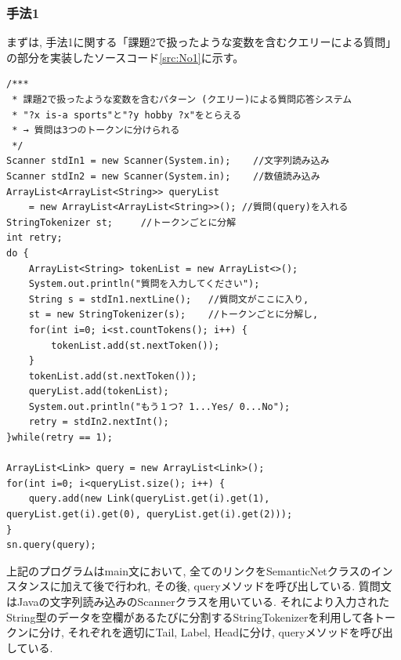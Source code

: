 \documentclass[uplatex,12pt]{jsarticle}
\begin{document}
\subsubsection{手法1}
まずは, 手法1に関する「課題2で扱ったような変数を含むクエリーによる質問」の部分を実装したソースコード\ref{src:No1}に示す。
\begin{lstlisting}[caption=クエリーの形に添った質問応答, label=src:No1]
/***
 * 課題2で扱ったような変数を含むパターン (クエリー)による質問応答システム
 * "?x is-a sports"と"?y hobby ?x"をとらえる
 * → 質問は3つのトークンに分けられる
 */
Scanner stdIn1 = new Scanner(System.in);	//文字列読み込み
Scanner stdIn2 = new Scanner(System.in);	//数値読み込み
ArrayList<ArrayList<String>> queryList 
    = new ArrayList<ArrayList<String>>(); //質問(query)を入れる
StringTokenizer st;		//トークンごとに分解
int retry;
do {
	ArrayList<String> tokenList = new ArrayList<>();
	System.out.println("質問を入力してください");
	String s = stdIn1.nextLine(); 	//質問文がここに入り,
	st = new StringTokenizer(s);	//トークンごとに分解し,
	for(int i=0; i<st.countTokens(); i++) {
		tokenList.add(st.nextToken());
	}
	tokenList.add(st.nextToken());
	queryList.add(tokenList);
	System.out.println("もう１つ? 1...Yes/ 0...No");
	retry = stdIn2.nextInt();
}while(retry == 1);

ArrayList<Link> query = new ArrayList<Link>();
for(int i=0; i<queryList.size(); i++) {
	query.add(new Link(queryList.get(i).get(1), queryList.get(i).get(0), queryList.get(i).get(2)));
}
sn.query(query);
\end{lstlisting}

上記のプログラムはmain文において, 全てのリンクをSemanticNetクラスのインスタンスに加えて後で行われ, その後, queryメソッドを呼び出している. 質問文はJavaの文字列読み込みのScannerクラスを用いている. それにより入力されたString型のデータを空欄があるたびに分割するStringTokenizerを利用して各トークンに分け, それぞれを適切にTail, Label, Headに分け, queryメソッドを呼び出している.
\end{document}
